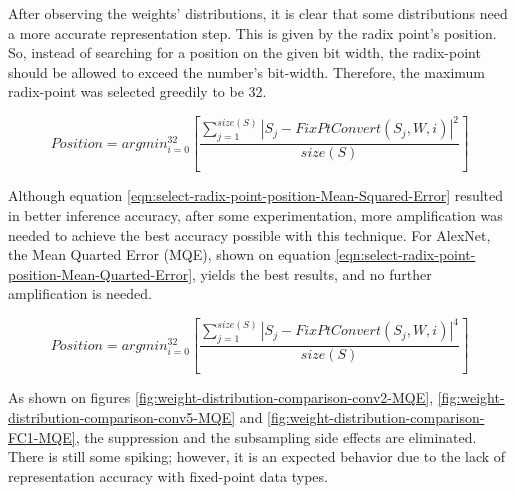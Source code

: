 After observing the weights' distributions, it is clear that some distributions need a more accurate representation step. This is given by the radix point's position. So, instead of searching for a position on the given bit width, the radix-point should be allowed to exceed the number's bit-width. Therefore, the maximum radix-point was selected greedily to be 32.

\begin{equation}
	\label{eqn:select-radix-point-position-Mean-Squared-Error}
	Position = argmin_{i=0}^{32}[\frac{\sum_{j=1}^{size(S)} |S_j - FixPtConvert(S_j, W, i)|^2 }{size(S)}]
\end{equation}

Although equation \ref{eqn:select-radix-point-position-Mean-Squared-Error} resulted in better inference accuracy, after some experimentation, more amplification was needed to achieve the best accuracy possible with this technique. For AlexNet, the Mean Quarted Error (MQE), shown on equation \ref{eqn:select-radix-point-position-Mean-Quarted-Error}, yields the best results, and no further amplification is needed.

\begin{equation}
	\label{eqn:select-radix-point-position-Mean-Quarted-Error}
	Position = argmin_{i=0}^{32}[\frac{\sum_{j=1}^{size(S)} |S_j - FixPtConvert(S_j, W, i)|^4 }{size(S)}]
\end{equation}

As shown on figures \ref{fig:weight-distribution-comparison-conv2-MQE}, \ref{fig:weight-distribution-comparison-conv5-MQE} and \ref{fig:weight-distribution-comparison-FC1-MQE}, the suppression and the subsampling side effects are eliminated. There is still some spiking; however, it is an expected behavior due to the lack of representation accuracy with fixed-point data types.

